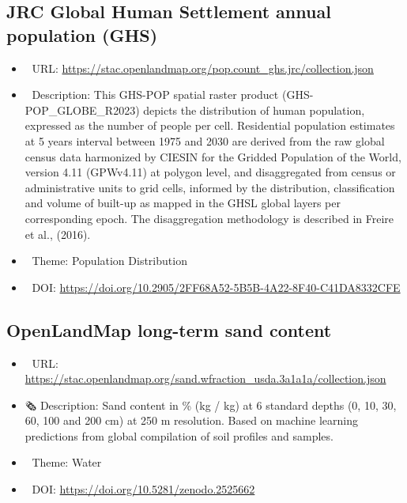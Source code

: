 \documentclass[
  graybox,natbib,nospthms]{svmono}
\providecommand{\tightlist}{%
  \setlength{\itemsep}{0pt}\setlength{\parskip}{0pt}}
\providecommand{\tightlist}{\setlength{\itemsep}{0pt}\setlength{\parskip}{0pt}}
\begin{document}
\hypertarget{jrc-global-human-settlement-annual-population-ghs}{%
\subsection{JRC Global Human Settlement annual population (GHS)}\label{jrc-global-human-settlement-annual-population-ghs}}

\begin{itemize}
\tightlist
\item
  🔗 URL: \url{https://stac.openlandmap.org/pop.count_ghs.jrc/collection.json}
\item
  📰 Description: This GHS-POP spatial raster product (GHS-POP\_GLOBE\_R2023) depicts the distribution of human population, expressed as the number of people per cell. Residential population estimates at 5 years interval between 1975 and 2030 are derived from the raw global census data harmonized by CIESIN for the Gridded Population of the World, version 4.11 (GPWv4.11) at polygon level, and disaggregated from census or administrative units to grid cells, informed by the distribution, classification and volume of built-up as mapped in the GHSL global layers per corresponding epoch. The disaggregation methodology is described in Freire et al., (2016).
\item
  📝 Theme: Population Distribution
\item
  📂 DOI: \url{https://doi.org/10.2905/2FF68A52-5B5B-4A22-8F40-C41DA8332CFE}
\end{itemize}

\hypertarget{openlandmap-long-term-sand-content}{%
\subsection{OpenLandMap long-term sand content}\label{openlandmap-long-term-sand-content}}

\begin{itemize}
\tightlist
\item
  🔗 URL: \url{https://stac.openlandmap.org/sand.wfraction_usda.3a1a1a/collection.json}
\item
  🗞 Description: Sand content in \% (kg / kg) at 6 standard depths (0, 10, 30, 60, 100 and 200 cm) at 250 m resolution. Based on machine learning predictions from global compilation of soil profiles and samples.
\item
  📝 Theme: Water
\item
  📂 DOI: \url{https://doi.org/10.5281/zenodo.2525662}
\end{itemize}
\end{document}
